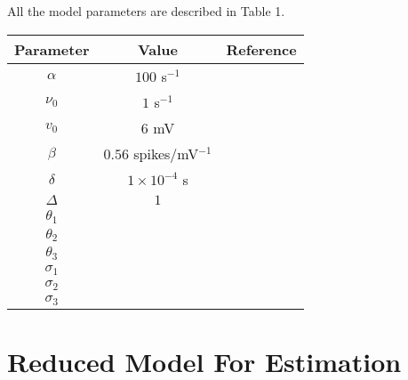 \documentclass[onecolumn,draftcls]{IEEEtran}
\begin{document}
All the model parameters are described in Table 1.


\begin{tabular}{ccc}
\hline
Parameter & Value & Reference\\
\hline
$\alpha$ & $100$ s$^{-1}$ &\\
\hline
$\nu_0$ & $1$ s$^{-1}$ &\\
\hline
$v_0$ & $6$ mV &\\
\hline
$\beta$ & $0.56$ spikes/mV$^{-1}$ & \\
\hline
$\delta$ & $1\times10^{-4}$ s &\\
\hline
$\Delta$ & $1$ &\\
\hline
$\theta_1$ &  &\\
\hline
$\theta_2$ &  &\\
\hline
$\theta_3$ &  &\\
\hline
$\sigma_1$ &  &\\
\hline
$\sigma_2$ &  &\\
\hline
$\sigma_3$ &  &\\
\hline
\end{tabular}


\section{Reduced Model For Estimation}
\end{document}
